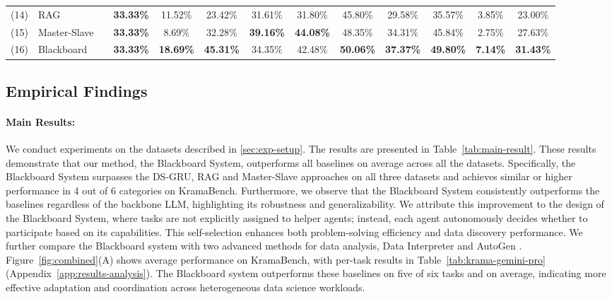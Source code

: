 \begin{table}
{\begin{tabular}{ll c cccccc c c c c}
        
        (14) & {RAG} &  & \textbf{33.33\%} & 11.52\% & 23.42\% & 31.61\% & 31.80\% & 45.80\% & 29.58\% & 35.57\% & 3.85\% & 23.00\% \\


        (15) & {Master-Slave} & & \textbf{33.33\%} & 8.69\% & 32.28\% & \textbf{39.16\%} & \textbf{44.08\%} & 48.35\% & 34.31\% & 45.84\% & 2.75\% & 27.63\% \\

        \cmidrule{1-2} \cmidrule{4-13}

        (16) & {Blackboard} &  & \textbf{33.33\%} & \textbf{18.69\%} & \textbf{45.31\%} & 34.35\% & 42.48\% & \textbf{50.06\%} & \textbf{37.37\%} & \textbf{49.80\%} & \textbf{7.14\%} & \textbf{31.43\%} \\
        \bottomrule
    \end{tabular}}
\end{table}


\subsection{Empirical Findings}

\paragraph{Main Results:} 


We conduct experiments on the datasets described in \textsection\ref{sec:exp-setup}. The results are presented in Table~\ref{tab:main-result}. These results demonstrate that our method, the Blackboard System, outperforms all baselines on average across all the datasets. Specifically, the Blackboard System surpasses the DS-GRU, RAG and Master-Slave approaches on all three datasets and achieves similar or higher performance in 4 out of 6 categories on KramaBench. Furthermore, we observe that the Blackboard System consistently outperforms the baselines regardless of the backbone LLM, highlighting its robustness and generalizability. We attribute this improvement to the design of the Blackboard System, where tasks are not explicitly assigned to helper agents; instead, each agent autonomously decides whether to participate based on its capabilities. This self-selection enhances both problem-solving efficiency and data discovery performance. We further compare the Blackboard system with two advanced methods for data analysis, Data Interpreter \citep{hong-etal-2025-data} and AutoGen \citep{wu2023autogenenablingnextgenllm}. Figure~\ref{fig:combined}(A) shows average performance on KramaBench, with per-task results in Table~\ref{tab:krama-gemini-pro} (Appendix~\ref{app:results-analysis}). The Blackboard system outperforms these baselines on five of six tasks and on average, indicating more effective adaptation and coordination across heterogeneous data science workloads.


